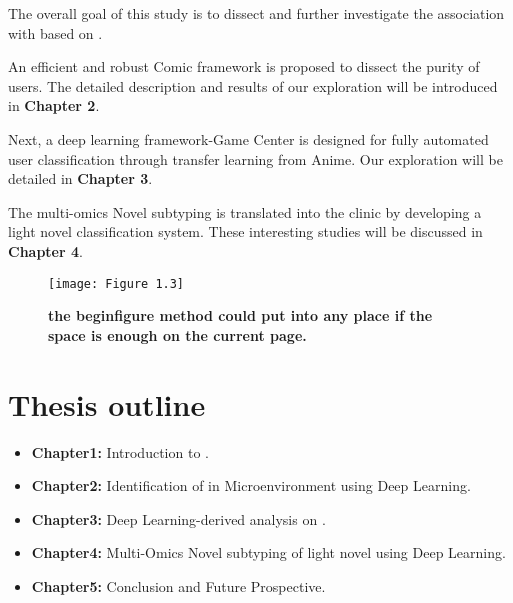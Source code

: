 The overall goal of this study is to dissect and further investigate the association with  based on . 

An efficient and robust Comic framework is proposed to dissect the purity of users. The detailed description and results of our exploration will be introduced in \textbf{Chapter 2}.


Next, a deep learning framework-Game Center is designed for fully automated user classification through transfer learning from Anime. Our exploration will be detailed in \textbf{Chapter 3}.


The multi-omics Novel subtyping is translated into the clinic by developing a light novel classification system. These interesting studies will be discussed in \textbf{Chapter 4}.


\begin{figure}[htbp!]
  \centering
  \texttt{[image: Figure 1.3]}
  \caption[But figure 1.2 did not have the enough space to put on the current pages]{\textbf{the begin{figure} method could put into any place if the space is enough on the current page.}}
  \end{figure}



\section{Thesis outline}

\begin{itemize}
    \item \textbf{Chapter1:} Introduction to .
    \item \textbf{Chapter2:} Identification of in Microenvironment using Deep Learning.
    \item \textbf{Chapter3:} Deep Learning-derived analysis on .
    \item \textbf{Chapter4:} Multi-Omics Novel subtyping of light novel using Deep Learning.
    \item \textbf{Chapter5:} Conclusion and Future Prospective.
\end{itemize}